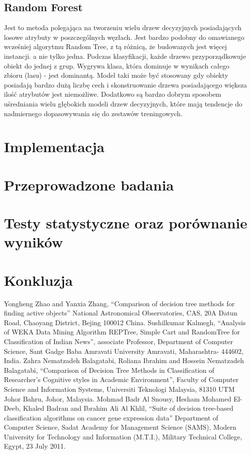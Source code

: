 \documentclass[conference]{IEEEtran}
\begin{document}
\subsection{Random Forest}
Jest to metoda polegająca na tworzeniu wielu drzew decyzyjnych posiadających losowe atrybuty w poszczególnych węzłach. Jest bardzo podobny do omawianego wcześniej algorytmu Random Tree, z  tą różnicą, że budowanych jest więcej instancji. a nie tylko jedna. Podczas klasyfikacji, każde drzewo przyporządkowuje obiekt do jednej z grup. Wygrywa klasa, która dominuje w wynikach całego zbioru (lasu) - jest dominantą. Model taki może być stosowany gdy obiekty posiadają bardzo dużą liczbę cech i skonstruowanie drzewa posiadającego większa ilość atrybutów  jest niemożliwe. Dodatkowo są bardzo dobrym sposobem uśredniania wielu głębokich modeli drzew decyzyjnych, które mają tendencje do nadmiernego dopasowywania się do zestawów treningowych.

\section{Implementacja}

\section{Przeprowadzone badania}

\section{Testy statystyczne oraz porównanie wyników}

\section{Konkluzja}

\begin{thebibliography}{00}
 Yongheng Zhao and Yanxia Zhang, ``Comparison of decision tree methods for finding active objects'' National Astronomical Observatories, CAS, 20A Datun Road, Chaoyang District, Bejing 100012 China.
 Sushilkumar Kalmegh, ``Analysis of WEKA Data Mining Algorithm REPTree, Simple Cart and RandomTree for Classification of Indian News'', associate Professor, Department of Computer Science, Sant Gadge Baba Amravati University
Amravati, Maharashtra- 444602, India.
 Zahra Nematzadeh Balagatabi, Roliana Ibrahim and Hossein Nematzadeh Balagatabi, ``Comparison of Decision Tree Methods in Classification of Researcher’s Cognitive styles in Academic Environment'', Faculty of Computer Science and Information Systems, Universiti Teknologi Malaysia, 81310 UTM Johor Bahru, Johor, Malaysia.
 Mohmad Badr Al Snousy, Hesham Mohamed El-Deeb, Khaled Badran and Ibrahim Ali Al Khlil, ``Suite of decision tree-based classification algorithms on cancer gene expression data'' Department of Computer Science, Sadat Academy for Management Science (SAMS), Modern University for Technology and Information (M.T.I.),  Military Technical College, Egypt, 23 July 2011.
\end{thebibliography}
\end{document}
